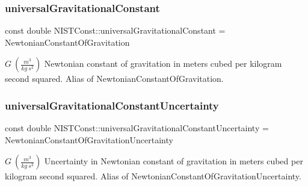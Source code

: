 \subsubsection{\texorpdfstring{universal\+Gravitational\+Constant}{universalGravitationalConstant}}
{\footnotesize\ttfamily const double N\+I\+S\+T\+Const\+::universal\+Gravitational\+Constant = Newtonian\+Constant\+Of\+Gravitation}

$G \ (\frac{m^3}{kg\ s^2})$ Newtonian constant of gravitation in meters cubed per kilogram second squared. Alias of Newtonian\+Constant\+Of\+Gravitation. \mbox{\label{group___gravitational_constant_gaa748102f8262fa5e50c1d0090585593e}} 
\subsubsection{\texorpdfstring{universal\+Gravitational\+Constant\+Uncertainty}{universalGravitationalConstantUncertainty}}
{\footnotesize\ttfamily const double N\+I\+S\+T\+Const\+::universal\+Gravitational\+Constant\+Uncertainty = Newtonian\+Constant\+Of\+Gravitation\+Uncertainty}

$G \ (\frac{m^3}{kg\ s^2})$ Uncertainty in Newtonian constant of gravitation in meters cubed per kilogram second squared. Alias of Newtonian\+Constant\+Of\+Gravitation\+Uncertainty. 